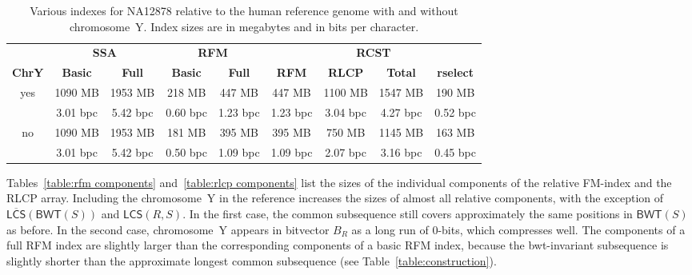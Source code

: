 \documentclass[a4paper,11pt]{llncs}
\renewcommand{\complement}[1]{\ensuremath{\overline{ #1 }}}
\newcommand{\RCST}{\textsf{RCST}}
\newcommand{\SSA}{\textsf{SSA}}
\newcommand{\RFM}{\textsf{RFM}}
\newcommand{\mBWT}{\ensuremath{\mathsf{BWT}}}
\newcommand{\RLCP}{\textsf{RLCP}}
\newcommand{\mLCS}{\ensuremath{\mathsf{LCS}}}
\newcommand{\mCS}{\ensuremath{\complement{\mathsf{LCS}}}}
\newcommand{\rselect}{\textsf{rselect}}
\newcommand{\zerobit}{$0$\nobreakdash-bit}
\begin{document}
\begin{table}
\caption{Various indexes for NA12878 relative to the human reference genome
with and without chromosome~Y. Index sizes are in megabytes and in bits per
character.}\label{table:indexes}
\setlength{\extrarowheight}{2pt}
\setlength{\tabcolsep}{3pt}
\begin{center}
\begin{tabular}{c|cc|cc|cccc}
\hline
 &
\multicolumn{2}{c|}{\textbf{\SSA}} &
\multicolumn{2}{c|}{\textbf{\RFM}} &
\multicolumn{4}{c}{\textbf{\RCST}} \\
\textbf{ChrY} &
\textbf{Basic} & \textbf{Full} &
\textbf{Basic} & \textbf{Full} &
\textbf{\RFM} & \textbf{\RLCP} & \textbf{Total} & \textbf{\rselect} \\
\hline
\multirow{2}{*}{yes} &  1090 MB &  1953 MB &   218 MB &   447 MB &   447 MB &
1100 MB &  1547 MB &   190 MB \\
                     & 3.01 bpc & 5.42 bpc & 0.60 bpc & 1.23 bpc & 1.23 bpc &
3.04 bpc & 4.27 bpc & 0.52 bpc \\
\hline
\multirow{2}{*}{no}  &  1090 MB &  1953 MB &   181 MB &   395 MB &   395 MB &
750 MB &  1145 MB &   163 MB \\
                     & 3.01 bpc & 5.42 bpc & 0.50 bpc & 1.09 bpc & 1.09 bpc &
2.07 bpc & 3.16 bpc & 0.45 bpc \\
\hline
\end{tabular}
\end{center}
\end{table}

Tables~\ref{table:rfm components} and~\ref{table:rlcp components} list
the sizes of the individual components of the relative FM-index and the
\RLCP{} array. Including the chromosome~Y in the reference increases the sizes
of almost all relative components, with the exception of $\mCS(\mBWT(S))$ and
$\mLCS(R,S)$. In the first case, the common subsequence still covers
approximately the same positions in $\mBWT(S)$ as before. In the second case,
chromosome~Y appears in bitvector $B_{R}$ as a long run of \zerobit{}s, which
compresses well. The components of a full \RFM{} index are slightly larger
than the corresponding components of a basic \RFM{} index, because the
bwt-invariant subsequence is slightly shorter than the approximate longest
common subsequence (see Table~\ref{table:construction}).
\end{document}

